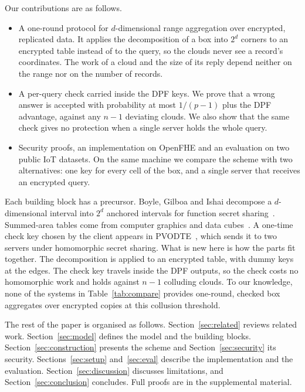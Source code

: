 \documentclass[10pt,journal,compsoc]{IEEEtran}
\begin{document}
Our contributions are as follows.
\begin{itemize}
\item A one-round protocol for $d$-dimensional range aggregation over
encrypted, replicated data. It applies the decomposition of a box into $2^d$
corners to an encrypted table instead of to the query, so the clouds never see
a record's coordinates. The work of a cloud and the size of its reply depend
neither on the range nor on the number of records.
\item A per-query check carried inside the DPF keys. We prove that a wrong
answer is accepted with probability at most $1/(p-1)$ plus the DPF advantage,
against any $n-1$ deviating clouds. We also show that the same check gives no
protection when a single server holds the whole query.
\item Security proofs, an implementation on OpenFHE and an evaluation on two
public IoT datasets. On the same machine we compare the scheme with two
alternatives: one key for every cell of the box, and a single server that
receives an encrypted query.
\end{itemize}

Each building block has a precursor. Boyle, Gilboa and Ishai decompose a
$d$-dimensional interval into $2^d$ anchored intervals for function secret
sharing~\cite[Cor.~3.4]{boyle2016function}. Summed-area tables come from
computer graphics and data cubes~\cite{crow1984summed,ho1997range}. A one-time
check key chosen by the client appears in PVODTE~\cite{li2026silent}, which
sends it to two servers under homomorphic secret sharing. What is new here is
how the parts fit together. The decomposition is applied to an encrypted table,
with dummy keys at the edges. The check key travels inside the DPF outputs, so
the check costs no homomorphic work and holds against $n-1$ colluding clouds.
To our knowledge, none of the systems in Table~\ref{tab:compare} provides
one-round, checked box aggregates over encrypted copies at this collusion
threshold.

The rest of the paper is organised as follows. Section~\ref{sec:related}
reviews related work. Section~\ref{sec:model} defines the model and the
building blocks. Section~\ref{sec:construction} presents the scheme and
Section~\ref{sec:security} its security. Sections~\ref{sec:setup}
and~\ref{sec:eval} describe the implementation and the evaluation.
Section~\ref{sec:discussion} discusses limitations, and
Section~\ref{sec:conclusion} concludes. Full proofs are in the supplemental
material.
\end{document}
